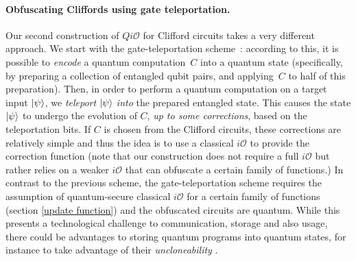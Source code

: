 \paragraph{Obfuscating Cliffords using gate teleportation.} Our second construction of $Qi\mathcal{O}$ for Clifford circuits takes a very different approach. We start with the gate-teleportation scheme~\cite{GC99}: according to this, it is possible to \emph{encode} a quantum computation~$C$ into a quantum state (specifically, by preparing a collection of entangled qubit pairs, and applying~$C$ to half of this preparation). Then, in order to perform a quantum computation on a target input ${\lvert}\psi\rangle$, we \emph{teleport} ${\lvert}\psi\rangle$ \emph{into} the prepared entangled state. This causes the state ${\lvert}\psi\rangle$ to undergo the evolution of $C$, \emph{up to some corrections}, based on the teleportation bits. If $C$ is chosen from the Clifford circuits, these corrections are relatively simple and thus the idea is to use a classical  $i\mathcal{O}$ to provide the correction function (note that our construction does not require a full $i\mathcal{O}$ but rather relies on a weaker $i\mathcal{O}$ that can obfuscate a certain family of functions.)
In contrast to the previous scheme, the gate-teleportation scheme requires the assumption of quantum-secure classical $i\mathcal{O}$ for a certain family of functions (section \ref{update function}) and the obfuscated circuits are quantum. While this presents a technological challenge to communication, storage and also usage, there could be advantages to storing quantum programs into quantum states, for instance to take advantage of their \emph{uncloneability} \cite{Aar09,BL19arxiv}.



